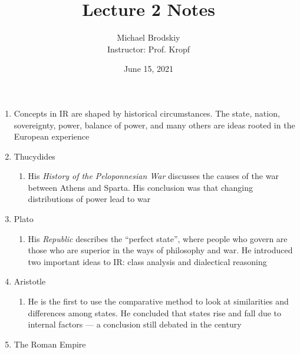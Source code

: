 \documentclass[12pt]{article}
\title{Lecture 2 Notes}
\date{June 15, 2021}
\author{Michael Brodskiy\\ \small Instructor: Prof. Kropf}
\begin{document}
    \maketitle

    \begin{enumerate}

      \item Concepts in IR are shaped by historical circumstances. The state, nation, sovereignty, power, balance of power, and many others are ideas rooted in the European experience

      \item Thucydides

        \begin{enumerate}

          \item His \textit{History of the Peloponnesian War} discusses the causes of the war between Athens and Sparta. His conclusion was that changing distributions of power lead to war

        \end{enumerate}

      \item Plato

        \begin{enumerate}

          \item His \textit{Republic} describes the “perfect state”, where people who govern are those who are superior in the ways of philosophy and war. He introduced two important ideas to IR: class analysis and dialectical reasoning

        \end{enumerate}

      \item Aristotle

        \begin{enumerate}

          \item He is the first to use the comparative method to look at similarities and differences among states. He concluded that states rise and fall due to internal factors — a conclusion still debated in the  century

        \end{enumerate}

      \item The Roman Empire

        \begin{enumerate}


\end{enumerate}
\end{enumerate}
\end{document}
